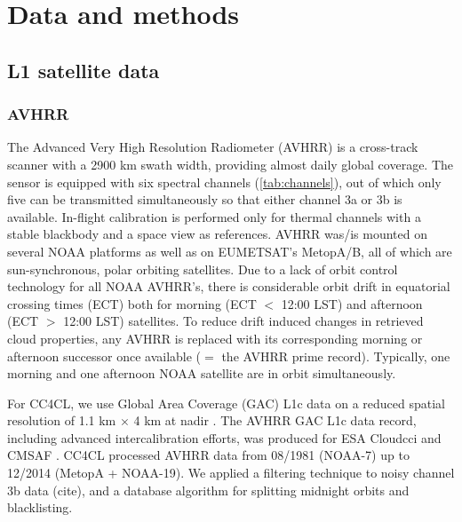 \section{Data and methods}\label{input_data}

\subsection{L1 satellite data}\label{sec:L1_data}

\subsubsection{AVHRR}

The Advanced Very High Resolution Radiometer (AVHRR) is a cross-track scanner with a 2900 km swath width, providing almost daily global coverage. The sensor is equipped with six spectral channels (\autoref{tab:channels}), out of which only five can be transmitted simultaneously so that either channel 3a or 3b is available. In-flight calibration is performed only for thermal channels with a stable blackbody and a space view as references. AVHRR was/is mounted on several NOAA platforms as well as on EUMETSAT's MetopA/B, all of which are sun-synchronous, polar orbiting satellites. Due to a lack of orbit control technology for all NOAA AVHRR's, there is considerable orbit drift in equatorial crossing times (ECT) both for morning (ECT $<$ 12:00 LST) and afternoon (ECT $>$ 12:00 LST) satellites. To reduce drift induced changes in retrieved cloud properties, any AVHRR is replaced with its corresponding morning or afternoon successor once available ($=$ the AVHRR prime record). Typically, one morning and one afternoon NOAA satellite are in orbit simultaneously. 

For CC4CL, we use Global Area Coverage (GAC) L1c data on a reduced spatial resolution of 1.1 km $\times$ 4 km at nadir \citep{Devasthale16}. The AVHRR GAC L1c data record, including advanced intercalibration efforts, was produced for ESA Cloud\textunderscore cci and CMSAF \citep{Schulz09,Karlsson13}. CC4CL processed AVHRR data from 08/1981 (NOAA-7) up to 12/2014 (MetopA + NOAA-19). We applied a filtering technique to noisy channel 3b data (cite), and a database algorithm for splitting midnight orbits and blacklisting. 

